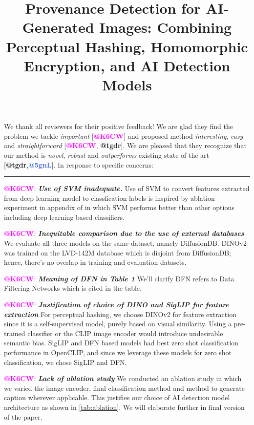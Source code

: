 \documentclass[10pt,twocolumn,letterpaper]{article}
\makeatletter
\newcommand{\rksixcw}{\textcolor{Magenta}{\bf \textbf{@K6CW}}}
\newcommand{\rtgdr}{\textcolor{RawSienna}{\bf \textbf{@tgdr}}}
\newcommand{\rfivegnl}{\textcolor{RoyalBlue}{\bf \textbf{@5gnL}}}
\makeatother
\begin{document}
\title{Provenance Detection for AI-Generated Images: Combining Perceptual Hashing, Homomorphic Encryption, and AI Detection Models}  %

\maketitle
\thispagestyle{empty}
\appendix

\noindent We thank all reviewers for their positive feedback! We are glad they find the problem we tackle \emph{important} [\rksixcw] and proposed method \emph{interesting}, \emph{easy} and \emph{straightforward} [\rksixcw, \rtgdr]. We are pleased that they recognize that our method is \emph{novel}, \emph{robust} and \emph{outperforms} existing state of the art [\rtgdr,\rfivegnl]. In response to specific concerns:
\noindent\rule{\linewidth}{0.5pt}
\rksixcw: \textbf{\emph{Use of SVM inadequate.}} Use of SVM to convert features extracted from deep learning model to classfication labels is inspired by ablation experiment in appendix of \cite{cozzolino2024raising} in which SVM performs better than other options including deep learning based classifiers.

\noindent \rksixcw:
\textbf{\emph{Inequitable comparison due to the use of external databases}} We evaluate all three models on the same dataset, namely DiffusionDB. DINOv2 was trained on the LVD-142M database which is disjoint from DiffusionDB; hence, there's no overlap in training and evaluation datasets. 

\noindent \rksixcw:
\textbf{\emph{Meaning of DFN in Table 1}} We'll clarify DFN refers to Data Filtering Networks which is cited in the table.

\noindent \rksixcw:
\textbf{\emph{Justification of choice of DINO and SigLIP for feature extraction}} For perceptual hashing, we choose DINOv2 for feature extraction since it is a self-supervised model, purely based on visual similarity. Using a pre-trained classifier or the CLIP image encoder would introduce undesirable semantic bias. SigLIP and DFN based models had best zero shot classification performance in OpenCLIP, and since we leverage these models for zero shot classification, we chose SigLIP and DFN.

\noindent \rksixcw:
\textbf{\emph{Lack of ablation study}} We conducted an ablation study in which we varied the image encoder, final classification method and method to generate caption wherever applicable. This justifies our choice of AI detection model architecture as shown in \autoref{tab:ablation}. We will elaborate further in final version of the paper.
\vspace{-10pt}
\end{document}

